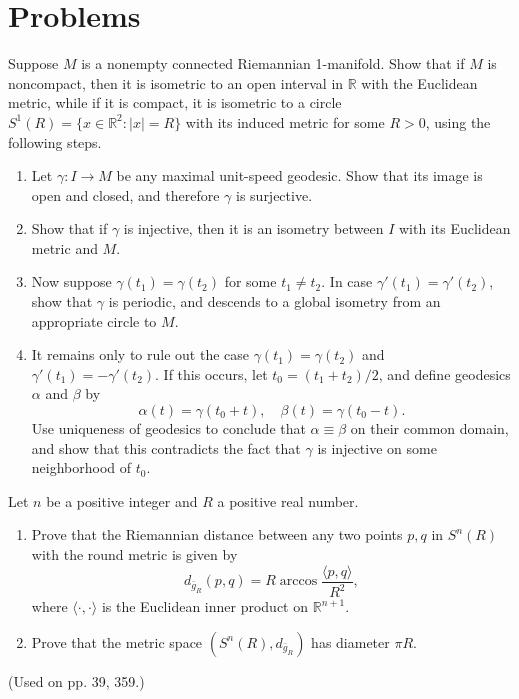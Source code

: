 \section{Problems}

\begin{exercise}
\label{prob:connected-riemannian-1-manifold-structure}

Suppose $M$ is a nonempty connected Riemannian 1-manifold. Show that if $M$ is noncompact, then it is isometric to an open interval in $\mathbb{R}$ with the Euclidean metric, while if it is compact, it is isometric to a circle $S^1(R) = \{x \in \mathbb{R}^2 : |x| = R\}$ with its induced metric for some $R > 0$, using the following steps.
\begin{enumerate}
\item[(a)] Let $\gamma : I \to M$ be any maximal unit-speed geodesic. Show that its image is open and closed, and therefore $\gamma$ is surjective.
\item[(b)] Show that if $\gamma$ is injective, then it is an isometry between $I$ with its Euclidean metric and $M$.
\item[(c)] Now suppose $\gamma(t_1) = \gamma(t_2)$ for some $t_1 \ne t_2$. In case $\gamma'(t_1) = \gamma'(t_2)$, show that $\gamma$ is periodic, and descends to a global isometry from an appropriate circle to $M$.
\item[(d)] It remains only to rule out the case $\gamma(t_1) = \gamma(t_2)$ and $\gamma'(t_1) = -\gamma'(t_2)$. If this occurs, let $t_0 = (t_1 + t_2)/2$, and define geodesics $\alpha$ and $\beta$ by
\[
\alpha(t) = \gamma(t_0 + t), \quad \beta(t) = \gamma(t_0 - t).
\]
Use uniqueness of geodesics to conclude that $\alpha \equiv \beta$ on their common domain, and show that this contradicts the fact that $\gamma$ is injective on some neighborhood of $t_0$.
\end{enumerate}
\end{exercise}

\begin{exercise}
\label{prob:round-metric-distance-sphere}

Let $n$ be a positive integer and $R$ a positive real number.
\begin{enumerate}
\item[(a)] Prove that the Riemannian distance between any two points $p, q$ in $S^n(R)$ with the round metric is given by
\[
d_{\bar{g}_R}(p,q) = R \arccos \frac{\langle p,q\rangle}{R^2},
\]
where $\langle\cdot,\cdot\rangle$ is the Euclidean inner product on $\mathbb{R}^{n+1}$.
\item[(b)] Prove that the metric space $(S^n(R), d_{\bar{g}_R})$ has diameter $\pi R$.
\end{enumerate}
(Used on pp. 39, 359.)
\end{exercise}

